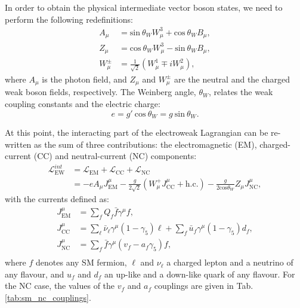 In order to obtain the physical intermediate vector boson states, we need to perform the following redefinitions:
\begin{equation}
	\begin{split}
		A_{\mu} &= \mathrm{sin}~\theta_{W} W^{3}_{\mu} + \mathrm{cos}~\theta_{W} B_{\mu},\\
		Z_{\mu} &= \mathrm{cos}~\theta_{W} W^{3}_{\mu} - \mathrm{sin}~\theta_{W} B_{\mu},\\
		W^{\pm}_{\mu} &= \frac{1}{\sqrt{2}}\left(W^{1}_{\mu} \mp i W^{2}_{\mu}\right),
	\end{split}
\end{equation}
where $A_{\mu}$ is the photon field, and $Z_{\mu}$ and $W^{\pm}_{\mu}$ are the neutral and the charged weak boson fields, respectively. The Weinberg angle, $\theta_{W}$, relates the weak coupling constants and the electric charge:
\begin{equation}
	e = g'~\mathrm{cos}~\theta_{W} = g~\mathrm{sin}~\theta_{W}.
\end{equation}

At this point, the interacting part of the electroweak Lagrangian can be re-written as the sum of three contributions: the electromagnetic (EM), charged-current (CC) and neutral-current (NC) components:
\begin{equation}\label{eq:int_lagrangian}
	\begin{split}
		\mathcal{L}^{int}_{\mathrm{EW}} &= \mathcal{L}_{\mathrm{EM}}+\mathcal{L}_{\mathrm{CC}}+\mathcal{L}_{\mathrm{NC}}\\
		&= -e A_{\mu} J^{\mu}_{\mathrm{EM}} - \frac{g}{2\sqrt{2}} \left(W^{+}_{\mu}J^{\mu}_{\mathrm{CC}} + \mathrm{h.c.}\right) - \frac{g}{2 \mathrm{cos}\theta_{W}} Z_{\mu} J^{\mu}_{\mathrm{NC}},
	\end{split}
\end{equation}
with the currents defined as:
\begin{equation}\label{eq:currents}
	\begin{split}
		J^{\mu}_{\mathrm{EM}} &= \sum_{f} Q_{f} \bar{f}\gamma^{\mu}f,\\
		J^{\mu}_{\mathrm{CC}} &= \sum_{\ell}\bar{\nu}_{\ell}\gamma^{\mu}(1-\gamma_{5})\ell + \sum_{f}\bar{u}_{f}\gamma^{\mu}(1-\gamma_{5})d_{f},\\
		J^{\mu}_{\mathrm{NC}} &= \sum_{f} \bar{f}\gamma^{\mu}(v_{f} - a_{f}\gamma_{5})f,\\
	\end{split}
\end{equation}
where $f$ denotes any SM fermion, $\ell$ and $\nu_{\ell}$ a charged lepton and a neutrino of any flavour, and $u_{f}$ and $d_{f}$ an up-like and a down-like quark of any flavour. For the NC case, the values of the $v_{f}$ and $a_{f}$ couplings are given in Tab. \ref{tab:sm_nc_couplings}.

